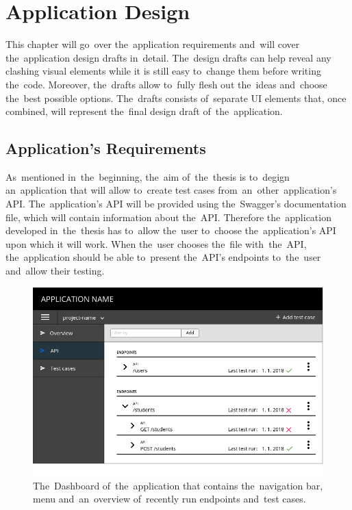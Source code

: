 \chapter{Application Design}
\label{Design}
This chapter will go~over the~application requirements and~will cover
the~application design drafts in~detail. The~design drafts can help reveal any
clashing visual elements while it is still easy to~change them before writing
the~code. Moreover, the~drafts allow to~fully flesh out the~ideas and~choose
the~best possible options. The~drafts consists of~separate UI elements that,
once combined, will represent the~final design draft of~the~application.

\section{Application's Requirements}
As~mentioned in~the~beginning, the~aim of~the~thesis is to~degign an~application
that will allow to~create test cases from~an~other~application's API.
The~application's API will be provided using the~Swagger's documentation file,
which will contain information about the~API. Therefore the~application
developed in~the~thesis has to~allow the~user to~choose the~application's API
upon which it will work. When the~user chooses the~file with~the~API,
the~application should be able to~present the~API's endpoints to~the~user
and~allow their testing. 

\begin{figure}[!hbt]
	\centering
	\includegraphics[scale=0.4]{./designs/drafts-1.0/dashboard.png}
	\caption{The~Dashboard of~the~application that contains the~navigation bar,
	menu and~an~overview of~recently run endpoints and~test cases.}
	\label{dashboard}
\end{figure}

